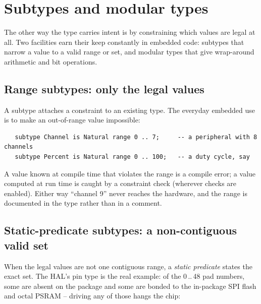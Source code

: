 
\section{Subtypes and modular types}
\label{sec:subtypes}

The other way the type carries intent is by constraining which values are legal
at all. Two facilities earn their keep constantly in embedded code: subtypes that
narrow a value to a valid range or set, and modular types that give wrap-around
arithmetic and bit operations.

\subsection{Range subtypes: only the legal values}

A subtype attaches a constraint to an existing type. The everyday embedded use is
to make an out-of-range value impossible:

\begin{lstlisting}
   subtype Channel is Natural range 0 .. 7;     -- a peripheral with 8 channels
   subtype Percent is Natural range 0 .. 100;   -- a duty cycle, say
\end{lstlisting}

A value known at compile time that violates the range is a compile error; a value
computed at run time is caught by a constraint check (wherever checks are
enabled). Either way ``channel 9'' never reaches the hardware, and the range is
documented in the type rather than in a comment.

\subsection{Static-predicate subtypes: a non-contiguous valid set}

When the legal values are not one contiguous range, a \emph{static predicate}
states the exact set. The HAL's pin type is the real example: of the 0\,..\,48 pad
numbers, some are absent on the package and some are bonded to the in-package SPI
flash and octal PSRAM -- driving any of those hangs the chip:

